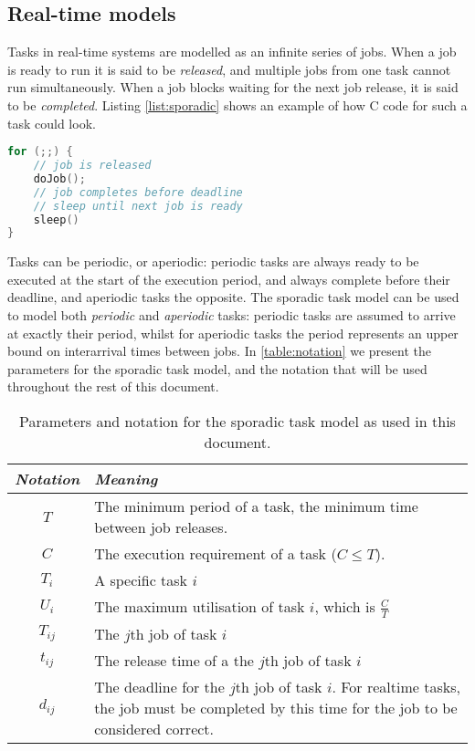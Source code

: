 \subsection{Real-time models}

Tasks in real-time systems are modelled as an infinite series of jobs.
When a job is ready to run it is said to be \emph{released}, and multiple jobs from one task cannot run simultaneously.
When a job blocks waiting for the next job release, it is said to be \emph{completed}.
Listing \ref{list:sporadic} shows an example of how C code for such a task could look.

\begin{lstlisting}[frame=single,language=c,caption=Example of a basic sporadic real-time task.,label=list:sporadic,float=htpb]
for (;;) {
	// job is released
	doJob();
	// job completes before deadline
    // sleep until next job is ready
    sleep()
}
\end{lstlisting}


\noindent
Tasks can be periodic, or aperiodic: periodic tasks are always ready to be executed at the start of the execution period, and always complete before their deadline, and aperiodic tasks the opposite.
The sporadic task model can be used to model both \emph{periodic} and \emph{aperiodic} tasks: periodic tasks are assumed to arrive at exactly their period, whilst for aperiodic tasks the period represents an upper bound on interarrival times between jobs.
In \autoref{table:notation} we present the parameters for the sporadic task model, and the notation that will be used throughout the rest of this document.

\begin{table}
\centering
    \begin{tabular}{cp{}}\toprule
    \emph{Notation} & \emph{Meaning} \\\midrule
    $T$               & The minimum period of a task, the minimum time between job releases. \\
    $C$               & The execution requirement of a task ($C \leq T$). \\
    $T_{i}$           & A specific task $i$ \\
    $U_{i}$           & The maximum utilisation of task $i$, which is $\frac{C}{T}$ \\
    $T_{ij}$          & The $j$th job of task $i$ \\
    $t_{ij}$          & The release time of a the $j$th job of task $i$ \\
    $d_{ij}$          & The deadline for the $j$th job of task $i$. For realtime tasks, the job must be completed by this time for the job to be considered correct. \\
    \bottomrule
    \end {tabular}
    \caption{Parameters and notation for the sporadic task model as used in this document.}
    \label{tab:notation}
\end{table}

